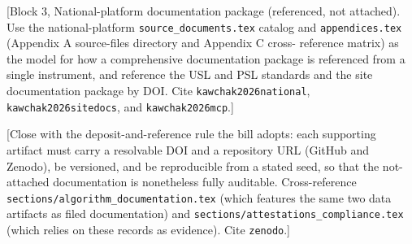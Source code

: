 [Block 3, National-platform documentation package (referenced, not attached). Use
the national-platform \texttt{source\_documents.tex} catalog and
\texttt{appendices.tex} (Appendix A source-files directory and Appendix C cross-
reference matrix) as the model for how a comprehensive documentation package is
referenced from a single instrument, and reference the USL and PSL standards and
the site documentation package by DOI. Cite \texttt{kawchak2026national},
\texttt{kawchak2026sitedocs}, and \texttt{kawchak2026mcp}.]

[Close with the deposit-and-reference rule the bill adopts: each supporting
artifact must carry a resolvable DOI and a repository URL (GitHub and Zenodo), be
versioned, and be reproducible from a stated seed, so that the not-attached
documentation is nonetheless fully auditable. Cross-reference
\texttt{sections/algorithm\_documentation.tex} (which features the same two data
artifacts as filed documentation) and \texttt{sections/attestations\_compliance.tex}
(which relies on these records as evidence). Cite \texttt{zenodo}.]

